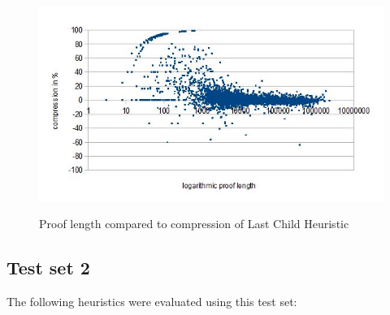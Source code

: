 \documentclass{llncs}
\begin{document}
\begin{figure}[tb]
	\includegraphics[scale=0.7]{Figures/LastChild.jpg}
	\label{fig:lastchild}
	\caption{Proof length compared to compression of Last Child Heuristic}
\end{figure}

\subsection{Test set 2}

The following heuristics were evaluated using this test set:
\end{document}
